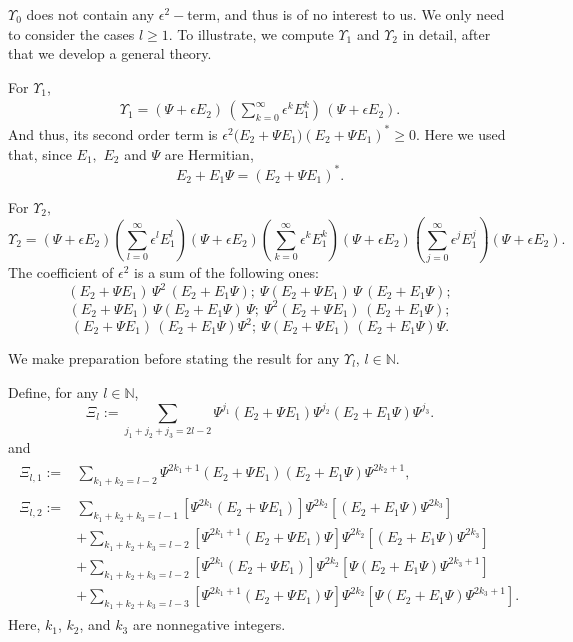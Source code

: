 \documentclass{article}
\numberwithin{equation}{section}
\begin{document}
$\Upsilon_0$ does not contain any $\epsilon^2-$term, and thus is of no interest to us. We only need to consider the cases $l\geq 1$. To illustrate, we compute $\Upsilon_1$ and $\Upsilon_2$ in detail, after that we develop a general theory.


For $\Upsilon_1$,
\begin{align*}
\Upsilon_1
  = 
    (\Psi + \epsilon E_2)\, (\sum_{k = 0}^{\infty}\epsilon^{k}E_1^k)\, (\Psi + \epsilon E_2).
\end{align*}
And thus, its second order term is $\epsilon^2 \bigl(E_2 + \Psi E_1)(E_2 + \Psi E_1)^* \geq 0.$ Here we used that, since $E_1,$ $E_2$ and $\Psi$ are Hermitian, 
\begin{equation}\label{eq:ThreeHerm}
E_2+E_1\Psi=(E_2+\Psi E_1)^*.
\end{equation}

For $\Upsilon_2,$
\begin{equation*}
\Upsilon_2 =   (\Psi + \epsilon E_2)
    \left( \sum_{l=0}^{\infty} \epsilon^l E_1^l \right)
    (\Psi + \epsilon E_2)
    \left( \sum_{k=0}^{\infty} \epsilon^k E_1^k \right)
    (\Psi + \epsilon E_2)
    \left( \sum_{j=0}^{\infty} \epsilon^j E_1^j \right)
    (\Psi + \epsilon E_2).
\end{equation*}
The coefficient of $\epsilon^2$ is a sum of the following ones: 
$$
 (E_2 + \Psi E_1)\, 
\Psi^2\, (E_2 + E_1 \Psi);\ 
\Psi (E_2 + \Psi E_1)\,
\Psi \, (E_2 + E_1 \Psi);
$$
$$
(E_2 + \Psi E_1)\, \Psi (E_2 + E_1 \Psi)\, \Psi;
\ 
\Psi^2 (E_2 + \Psi E_1)\, (E_2 + E_1 \Psi);
$$
$$
 (E_2 + \Psi E_1)\, (E_2 + E_1 \Psi)\Psi^2;\ 
\Psi (E_2 + \Psi E_1)\, (E_2 + E_1 \Psi)\Psi.
$$

We make preparation before stating the result for any $\Upsilon_l$, $l\in \mathbb{N}.$

Define, for any $l\in \mathbb{N}$,  
\begin{equation}\label{def:OmegaL}
\Xi_l :=  \sum_{j_1+j_2+j_3=2l-2} \Psi^{j_1} (E_2 + \Psi E_1) \Psi^{j_2} (E_2 + E_1 \Psi) \Psi^{j_3}.
\end{equation}
and
\begin{align}\label{def:Omegal12}
\begin{split}
\Xi_{l,1}:=&\sum_{ k_1 + k_2 = l-2} \Psi^{2 k_1 + 1} (E_2 + \Psi E_1) (E_2+E_1 \Psi ) \Psi^{2 k_2 + 1},\\\\
\Xi_{l,2}:= &\sum_{k_1 + k_2 + k_3 = l-1} \left[ \Psi^{2k_1} (E_2 + \Psi E_1) \right] \Psi^{2k_2} \left[ (E_2 + E_1 \Psi) \Psi^{2k_3} \right] \\
    &+ \sum_{k_1 + k_2 + k_3 = l-2} \left[ \Psi^{2k_1 + 1} (E_2 + \Psi E_1) \Psi \right] \Psi^{2k_2} \left[ (E_2 + E_1 \Psi) \Psi^{2k_3} \right] \\
    &+ \sum_{k_1 + k_2 + k_3 = l-2} \left[ \Psi^{2k_1 } (E_2 + \Psi E_1)  \right] \Psi^{2k_2} \left[\Psi (E_2 + E_1 \Psi) \Psi^{2k_3+1} \right] \\
    &+ \sum_{k_1 + k_2 + k_3 = l-3} \left[ \Psi^{2k_1 + 1} (E_2 + \Psi E_1) \Psi \right] \Psi^{2k_2} \left[ \Psi (E_2 + E_1 \Psi) \Psi^{2k_3 + 1} \right].
  \end{split}
\end{align}
Here, $k_1$, $k_2$, and $k_3$ are nonnegative integers.
\end{document}
